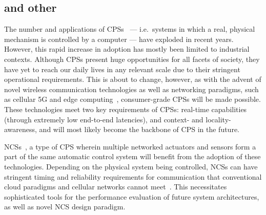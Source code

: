 \subsection{ and other }

The number and applications of \glspl{CPS}~\cite{Rajkumar2010CPS} --- i.e.\ systems in which a real, physical mechanism is controlled by a computer --- have exploded in recent years.
However, this rapid increase in adoption has mostly been limited to industrial contexts.
Although \glspl{CPS} present huge opportunities for all facets of society, they have yet to reach our daily lives in any relevant scale due to their stringent operational requirements.
This is about to change, however, as with the advent of novel wireless communication technologies as well as networking paradigms, such as cellular 5G and edge computing~\cite{Satya2017Emergence}, consumer-grade \glspl{CPS} will be made possible.
These technologies meet two key requirements of \glspl{CPS}: real-time capabilities (through extremely low end-to-end latencies), and context- and locality-awareness, and will most likely become the backbone of \gls{CPS} in the future.

\glspl{NCS}~\cite{Gupta2010NCSOverview}, a type of \gls{CPS} wherein multiple networked actuators and sensors form a part of the same automatic control system will benefit from the adoption of these technologies.
Depending on the physical system being controlled, \glspl{NCS} can have stringent timing and reliability requirements for communication that conventional cloud paradigms and cellular networks cannot meet~\cite{Wan2020Efficient}.
This necessitates sophisticated tools for the performance evaluation of future system architectures, as well as novel NCS design paradigm.


